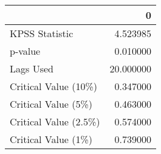 \begin{tabular}{lr}
\toprule
{} &          0 \\
\midrule
KPSS Statistic        &   4.523985 \\
p-value               &   0.010000 \\
Lags Used             &  20.000000 \\
Critical Value (10\%)  &   0.347000 \\
Critical Value (5\%)   &   0.463000 \\
Critical Value (2.5\%) &   0.574000 \\
Critical Value (1\%)   &   0.739000 \\
\bottomrule
\end{tabular}
